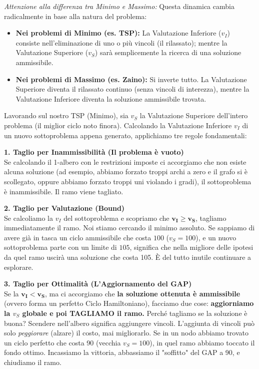 \documentclass[12pt, a4paper]{article}
\begin{document}
	\textit{Attenzione alla differenza tra Minimo e Massimo:}
	Questa dinamica cambia radicalmente in base alla natura del problema:
	\begin{itemize}[label=$\circ$, itemsep=2pt, leftmargin=1.5cm]
		\item \textbf{Nei problemi di Minimo (es. TSP):} La Valutazione Inferiore ($v_I$) consiste nell'eliminazione di uno o più vincoli (il rilassato); mentre la Valutazione Superiore ($v_S$) sarà semplicemente la ricerca di una soluzione ammissibile.
		\item \textbf{Nei problemi di Massimo (es. Zaino):} Si inverte tutto. La Valutazione Superiore diventa il rilassato continuo (senza vincoli di interezza), mentre la Valutazione Inferiore diventa la soluzione ammissibile trovata.
	\end{itemize}
	
	Lavorando sul nostro TSP (Minimo), sia $v_S$ la Valutazione Superiore dell'intero problema (il miglior ciclo noto finora). Calcolando la Valutazione Inferiore $v_I$ di un nuovo sottoproblema appena generato, applichiamo tre regole fondamentali:
	
	\textbf{1. Taglio per Inammissibilità (Il problema è vuoto)}\\
	Se calcolando il 1-albero con le restrizioni imposte ci accorgiamo che non esiste alcuna soluzione (ad esempio, abbiamo forzato troppi archi a zero e il grafo si è scollegato, oppure abbiamo forzato troppi uni violando i gradi), il sottoproblema è inammissibile. Il ramo viene tagliato.
	
	\textbf{2. Taglio per Valutazione (Bound)}\\
	Se calcoliamo la $v_I$ del sottoproblema e scopriamo che $\mathbf{v_I \geq v_S}$, tagliamo immediatamente il ramo. 
	Noi stiamo cercando il minimo assoluto. Se sappiamo di avere già in tasca un ciclo ammissibile che costa $100$ ($v_S = 100$), e un nuovo sottoproblema parte con un limite di $105$, significa che nella migliore delle ipotesi da quel ramo uscirà una soluzione che costa 105. È del tutto inutile continuare a esplorare.
	
	\textbf{3. Taglio per Ottimalità (L'Aggiornamento del GAP)}\\
	Se la $\mathbf{v_I < v_S}$, ma ci accorgiamo che \textbf{la soluzione ottenuta è ammissibile} (ovvero forma un perfetto Ciclo Hamiltoniano), facciamo due cose: \textbf{aggiorniamo la $v_S$ globale e poi TAGLIAMO il ramo.}
	Perché tagliamo se la soluzione è buona? Scendere nell'albero significa aggiungere vincoli. L'aggiunta di vincoli può solo \textit{peggiorare} (alzare) il costo, mai migliorarlo. Se in un nodo abbiamo trovato un ciclo perfetto che costa 90 (vecchia $v_S = 100$), in quel ramo abbiamo toccato il fondo ottimo. Incassiamo la vittoria, abbassiamo il "soffitto" del GAP a 90, e chiudiamo il ramo.
	
\end{document}
